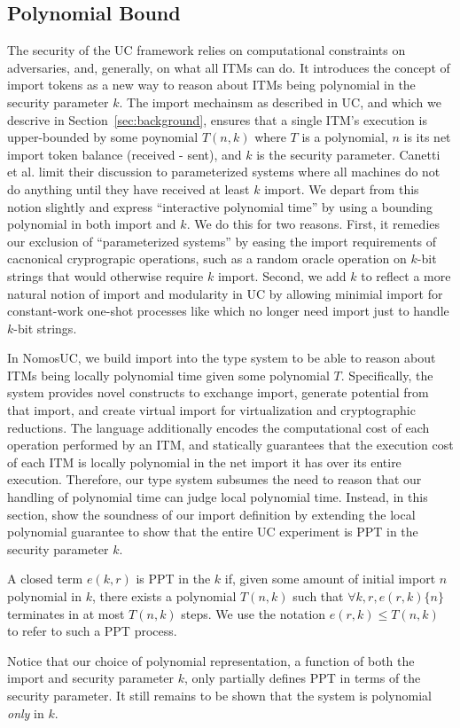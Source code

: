 \subsection{Polynomial Bound}
The security of the UC framework relies on computational constraints on adversaries, and, generally, on what all ITMs can do.
It introduces the concept of import tokens as a new way to reason about ITMs being polynomial in the security parameter $k$. 
The import mechainsm as described in UC, and which we descrive in Section~\ref{sec:background}, ensures that a single ITM's execution is upper-bounded by some poynomial $T(n,k)$ where $T$ is a polynomial, $n$ is its net import token balance (received - sent), and $k$ is the security parameter.
Canetti et al. limit their discussion to parameterized systems where all machines do not do anything until they have received at least $k$ import.
We depart from this notion slightly and express ``interactive polynomial time'' by using a bounding polynomial in both import and $k$.
We do this for two reasons.
First, it remedies our exclusion of ``parameterized systems'' by easing the import requirements of cacnonical cryprograpic operations, such as a random oracle operation on $k$-bit strings that would otherwise require $k$ import. 
Second, we add $k$ to reflect a more natural notion of import and modularity in UC by allowing minimial import for constant-work one-shot processes like \Fcom which no longer need import just to handle $k$-bit strings.

In NomosUC, we build import into the type system to be able to reason about ITMs being locally polynomial time given some polynomial $T$.
Specifically, the system provides novel constructs to exchange import, generate potential from that import, and create virtual import for virtualization and cryptographic reductions.
The language additionally encodes the computational cost of each operation performed by an ITM, and statically guarantees that the execution cost of each ITM is locally polynomial in the net import it has over its entire execution. 
Therefore, our type system subsumes the need to reason that our handling of polynomial time can judge local polynomial time.
Instead, in this section, show the soundness of our import definition by extending the local polynomial guarantee to show that the entire UC experiment is PPT in the security parameter $k$.

\begin{ddef}[PPT in $k$]\label{def:ppt}
A closed term $e(k,r)$ is  PPT in the $k$ if, given some amount of initial import $n$ polynomial in $k$, there exists a polynomial $T(n,k)$ such that $\forall k, r, e(r,k) \{n\}$ terminates in at most $T(n,k)$ steps.
We use the notation $e(r,k) \leq T(n,k)$ to refer to such a PPT process.
\end{ddef}
Notice that our choice of polynomial representation, a function of both the import and security parameter $k$, only partially defines PPT in terms of the security parameter. It still remains to be shown that the system is polynomial \emph{only} in $k$.

